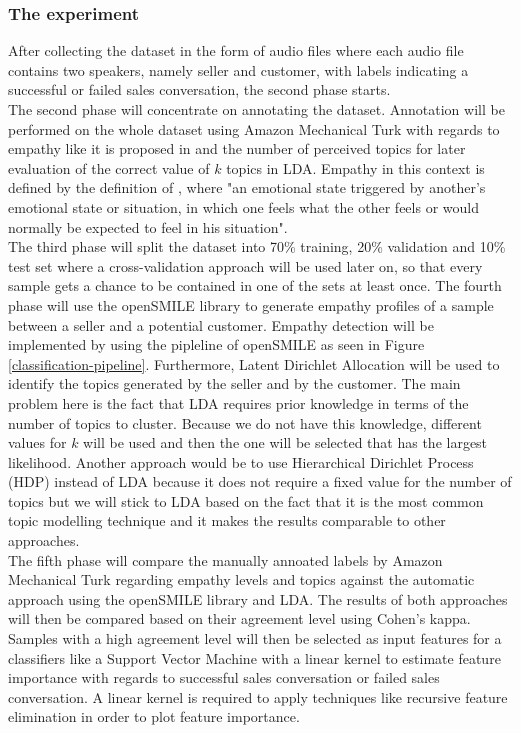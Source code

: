 \documentclass[twoside]{article}
\begin{document}
\begin{multicols}{2}
\subsubsection{The experiment}

After collecting the dataset in the form of audio files where each audio file contains two speakers, namely seller and customer, with labels indicating a successful or failed sales conversation, the second phase starts.\\
The second phase will concentrate on annotating the dataset. Annotation will be performed on the whole dataset using Amazon Mechanical Turk with regards to empathy like it is proposed in \cite{Alam2017} and the number of perceived topics for later evaluation of the correct value of $k$ topics in LDA. Empathy in this context is defined by the definition of \cite{Hoffman2008}, where "an emotional state triggered by another's emotional state or situation, in which one feels what the other feels or would normally be expected to feel in his situation".\\
The third phase will split the dataset into 70\% training, 20\% validation  and 10\% test set where a cross-validation approach will be used later on, so that every sample gets a chance to be contained in one of the sets at least once.
The fourth phase will use the openSMILE library to generate empathy profiles of a sample between a seller and a potential customer. Empathy detection will be implemented by using the pipleline of openSMILE as seen in Figure \ref{classification-pipeline}. Furthermore, Latent Dirichlet Allocation will be used to identify the topics generated by the seller and by the customer. The main problem here is the fact that LDA requires prior knowledge in terms of the number of topics to cluster. Because we do not have this knowledge, different values for $k$ will be used and then the one will be selected that has the largest likelihood. Another approach would be to use Hierarchical Dirichlet Process (HDP) instead of LDA because it does not require a fixed value for the number of topics but we will stick to LDA based on the fact that it is the most common topic modelling technique and it makes the results comparable to other approaches.\\
The fifth phase will compare the manually annoated labels by Amazon Mechanical Turk regarding empathy levels and topics against the automatic approach using the openSMILE library and LDA. The results of both approaches will then be compared based on their agreement level using Cohen's kappa. Samples with a high agreement level will then be selected as input features for a classifiers like a Support Vector Machine with a linear kernel to estimate feature importance with regards to successful sales conversation or failed sales conversation. A linear kernel is required to apply techniques like recursive feature elimination in order to plot feature importance.




\end{multicols}
\end{document}
